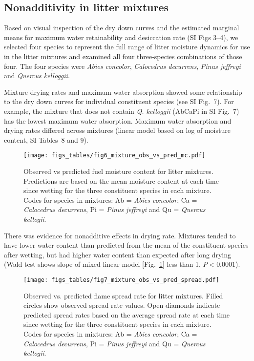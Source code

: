 \documentclass[letterpaper,12pt]{article}
\begin{document}
\subsection*{Nonadditivity in  litter mixtures}

Based on visual inspection of the dry down curves and the estimated marginal
means for maximum water retainability and desiccation rate (SI Figs 3--4), we
selected four species to represent the full range of litter moisture dynamics
for use in the litter mixtures and examined all four three-species combinations
of those four. The four species were \emph{Abies concolor}, \emph{Calocedrus
  decurrens}, \emph{Pinus jeffreyi} and \emph{Quercus kelloggii}.

Mixture drying rates and maximum water absorption showed some relationship to
the dry down curves for individual constituent species (see SI Fig.~7). For
example, the mixture that does not contain \emph{Q. kelloggii} (AbCaPi in SI
Fig.~7) has the lowest maximum water absorption. Maximum water absorption and
drying rates differed across mixtures (linear model based on log of moisture
content, SI Tables~8 and 9).


\begin{figure}[h]
  \centering
\texttt{[image: figs\_tables/fig6\_mixture\_obs\_vs\_pred\_mc.pdf]}
\caption{Observed vs predicted fuel moisture content for litter mixtures.
  Predictions are based on the mean moisture content at each time since wetting
  for the three constituent species in each mixture. Codes for species in
  mixtures: Ab = \emph{Abies concolor}, Ca = \emph{Calocedrus decurrens}, Pi =
  \emph{Pinus jeffreyi} and Qu = \emph{Quercus kellogii}.}
  \label{fig:mixture_obs_pred_mc}
\end{figure}


There was evidence for nonadditive effects in drying rate. Mixtures tended to
have lower water content than predicted from the mean of the constituent
species after wetting, but had higher water content than expected after long
drying (Wald test shows slope of mixed linear model
[Fig.~\ref{fig:mixture_obs_pred_mc}] less than 1, $P < 0.0001$).


\begin{figure}[h]
  \centering
\texttt{[image: figs\_tables/fig7\_mixture\_obs\_vs\_pred\_spread.pdf]}
\caption{Observed vs. predicted flame spread rate for litter mixtures. Filled
  circles show observed spread rate values. Open diamonds indicate predicted
  spread rates based on the average spread rate at each time since wetting for
  the three constituent species in each mixture. Codes for species in mixtures:
  Ab = \emph{Abies concolor}, Ca = \emph{Calocedrus decurrens}, Pi =
  \emph{Pinus jeffreyi} and Qu = \emph{Quercus kellogii}.}
  \label{fig:mixture_obs_pred_spread}
\end{figure}
\end{document}
